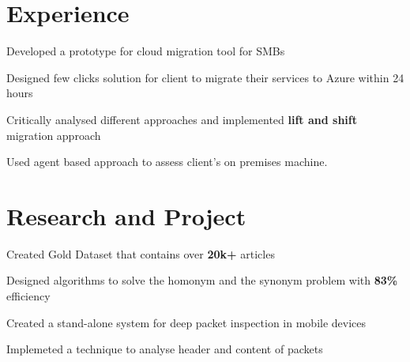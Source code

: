 \documentclass[a4paper]{deedy-resume-openfont}
\begin{document}
\hfill
\begin{minipage}[t]{0.63\textwidth} 

\section{Experience}
\vspace{\topsep}
\begin{tightemize}
\item Developed a prototype for cloud migration tool for SMBs
\item Designed few clicks solution for client to migrate their services to Azure within 24 hours
\item Critically analysed different approaches and implemented \textbf{lift and shift} migration approach
\item Used agent based approach to assess client's on premises machine.
\end{tightemize}

\section{Research and Project}

\begin{tightemize}
\item Created Gold Dataset that contains over \textbf{20k+} articles
\item Designed algorithms to solve the homonym and the synonym problem with \textbf{83\%} efficiency
\end{tightemize}
\sectionsep

\begin{tightemize}
\item Created a stand-alone system for deep packet inspection in mobile devices
\item Implemeted a technique to analyse header and content of packets
\end{tightemize}
\sectionsep


\end{minipage}
\end{document}
